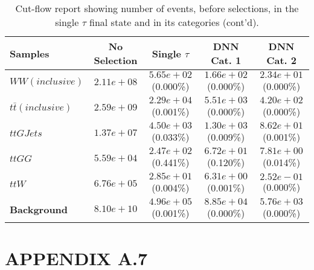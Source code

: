\begin{landscape}
\begin{table}
\centering
\caption{Cut-flow report showing number of events, before selections, in the single $\tau$ final state and in its categories (cont'd).}
\begin{tabular}{ |l|c|c|c|c| }
    \hline
    Samples                                & No Selection                   & Single $\tau$        & DNN Cat. 1        & DNN Cat. 2       \\
    \hline
    $WW(inclusive)$ &  $2.11e+08$  &   $5.65e+02$ (0.000\%) &  $1.66e+02$ (0.000\%) &  $2.34e+01$ (0.000\%) \\
                    $t\bar{t} (inclusive)$ &  $2.59e+09$  &   $2.29e+04$ (0.001\%) &  $5.51e+03$ (0.000\%) &  $4.20e+02$ (0.000\%) \\
                                 $ttGJets$ &  $1.37e+07$  &   $4.50e+03$ (0.033\%) &  $1.30e+03$ (0.009\%) &  $8.62e+01$ (0.001\%) \\
                                    $ttGG$ &  $5.59e+04$  &   $2.47e+02$ (0.441\%) &  $6.72e+01$ (0.120\%) &  $7.81e+00$ (0.014\%) \\
                                     $ttW$ &  $6.76e+05$  &   $2.85e+01$ (0.004\%) &  $6.31e+00$ (0.001\%) &  $2.52e-01$ (0.000\%) \\
                       \textbf{Background} &  $8.10e+10$  &   $4.96e+05$ (0.001\%) &  $8.85e+04$ (0.000\%) &  $5.76e+03$ (0.000\%) \\
    \hline
\end{tabular}
\end{table}
\end{landscape}


\section*{APPENDIX A.7}

